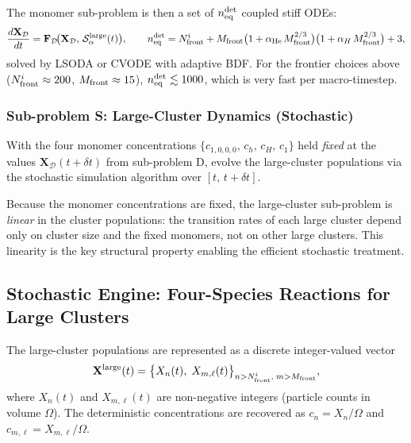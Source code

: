 The monomer sub-problem is then a set of
$n_{\rm eq}^{\rm det}$ coupled stiff ODEs:
\begin{equation}\label{eq:subD_system}
    \frac{d\mathbf{X}_{\mathcal{D}}}{dt}
    = \mathbf{F}_{\mathcal{D}}\!\bigl(
        \mathbf{X}_{\mathcal{D}},\,
        \mathcal{S}_\alpha^{\rm large}(t)
      \bigr),
    \qquad
    n_{\rm eq}^{\rm det}
    = N_{\rm front}^i
    + M_{\rm front}\bigl(1 + \alpha_{\rm He}\,M_{\rm front}^{2/3}\bigr)
      \bigl(1 + \alpha_H\,M_{\rm front}^{2/3}\bigr)
    + 3,
\end{equation}
solved by LSODA or CVODE with adaptive BDF.  For the frontier choices
above ($N_{\rm front}^i \approx 200$, $M_{\rm front} \approx 15$),
$n_{\rm eq}^{\rm det} \lesssim 1000$, which is very fast per
macro-timestep.

\subsubsection{Sub-problem S: Large-Cluster Dynamics (Stochastic)}
\label{sec:subS}

With the four monomer concentrations
$\{c_{1,0,0,0},\,c_h,\,c_H,\,c_1\}$ held \emph{fixed} at the values
$\mathbf{X}_{\mathcal{D}}(t+\delta t)$ from sub-problem D, evolve
the large-cluster populations via the stochastic simulation
algorithm over $[t,\, t+\delta t]$.

Because the monomer concentrations are fixed, the large-cluster
sub-problem is \emph{linear} in the cluster populations: the
transition rates of each large cluster depend only on cluster size
and the fixed monomers, not on other large clusters.  This
linearity is the key structural property enabling the efficient
stochastic treatment.

\subsection{Stochastic Engine: Four-Species Reactions for Large Clusters}
\label{sec:hybrid_SSA}

The large-cluster populations are represented as a discrete
integer-valued vector
\begin{equation}\label{eq:stoch_pop}
    \mathbf{X}^{\rm large}(t)
    = \bigl\{
        X_{n}(t),\; X_{m,\ell}(t)
      \bigr\}_{n > N_{\rm front}^i,\; m > M_{\rm front}},
\end{equation}
where $X_n(t)$ and $X_{m,\ell}(t)$ are non-negative integers
(particle counts in volume $\Omega$).  The deterministic
concentrations are recovered as $c_n = X_n / \Omega$ and
$c_{m,\ell} = X_{m,\ell} / \Omega$.


